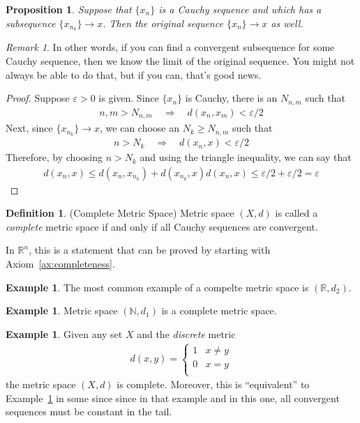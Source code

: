 \documentclass[12pt]{book}
\numberwithin{equation}{section} %
\theoremstyle{plain}
\newtheorem{prop}[thm]{Proposition}
\theoremstyle{definition}
\newtheorem{defn}[thm]{Definition}
\newtheorem{ex}[thm]{Example}
\theoremstyle{remark}
\newtheorem*{rmk}{Remark}
\newcommand{\R}{\mathbb{R}}
\newcommand{\N}{\mathbb{N}}
\begin{document}
\begin{prop}
\label{prop:cauchy-subseq}
Suppose that $\{x_n\}$ is a Cauchy sequence and which has a subsequence
$\{x_{n_k}\}\rightarrow x$. Then the original sequence
$\{x_n\}\rightarrow x$ as well.
\end{prop}
\begin{rmk}
In other words, if you can find a convergent subsequence for some Cauchy
sequence, then we know the limit of the original sequence. You might not
always be able to do that, but if you can, that's good news.
\end{rmk}
\begin{proof}
Suppose $\varepsilon>0$ is given.  Since $\{x_n\}$ is Cauchy, there is
an $N_{n,m}$ such that
\begin{align*}
  n,m>N_{n,m}
  \quad\Rightarrow\quad
  d(x_n,x_m) <\varepsilon/2
\end{align*}
Next, since $\{x_{n_k}\}\rightarrow x$, we can choose an $N_k \geq
N_{n,m}$ such that
\begin{align*}
  n > N_k
  \quad\Rightarrow\quad
  d(x_n, x) < \varepsilon/2
\end{align*}
Therefore, by choosing $n>N_k$ and using the triangle inequality, we can
say that
\begin{align*}
  d(x_n,x) \leq d(x_n, x_{n_k}) + d(x_{n_k},x)
  d(x_n,x) \leq \varepsilon/2 + \varepsilon/2 = \varepsilon
\end{align*}
\end{proof}

\begin{defn}{(Complete Metric Space)}
Metric space $(X,d)$ is called a \emph{complete} metric space if and
only if all Cauchy sequences are convergent.

In $\R^n$, this is a statement that can be proved by starting
with Axiom~\ref{ax:completeness}.
\end{defn}

\begin{ex}
The most common example of a compelte metric space is
$(\R,d_2)$.
\end{ex}

\begin{ex}
\label{ex:Ncomplete}
Metric space $(\N,d_1)$ is a complete metric space.
\end{ex}

\begin{ex}
Given any set $X$ and the \emph{discrete} metric
\begin{align*}
  d(x,y) =
  \begin{cases}
    1 & x\neq y \\
    0 & x= y \\
  \end{cases}
\end{align*}
the metric space $(X,d)$ is complete.
Moreover, this is ``equivalent'' to Example~\ref{ex:Ncomplete} in some
since since in that example and in this one, all convergent sequences
must be constant in the tail.
\end{ex}
\end{document}
